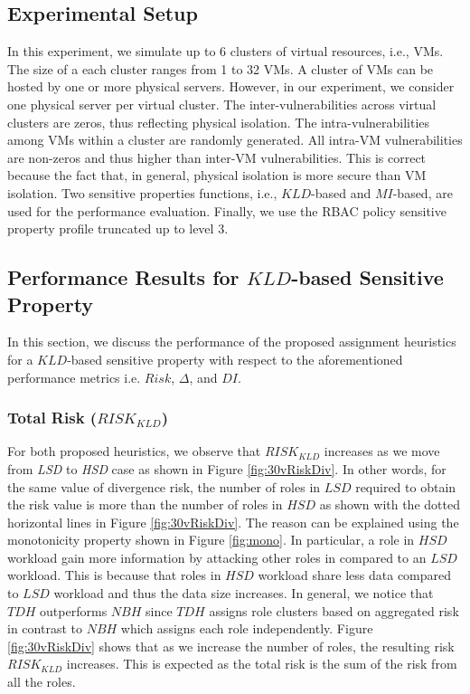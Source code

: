 \subsection{Experimental Setup}
In this experiment, we simulate up to 6 clusters of virtual resources, i.e., VMs. The size of a each cluster ranges from 1 to 32 VMs. A cluster of VMs can be hosted by one or more physical servers. However, in our experiment, we consider one physical server per virtual cluster. The inter-vulnerabilities across virtual clusters are zeros, thus reflecting  physical isolation. The intra-vulnerabilities among VMs within a cluster are randomly generated. All intra-VM vulnerabilities are non-zeros and thus higher than inter-VM vulnerabilities. This is correct because the fact that, in general, physical isolation is more secure than VM isolation. Two sensitive properties functions, i.e., $KLD$-based and $MI$-based, are used for the performance evaluation. Finally, we use the RBAC policy sensitive property profile truncated up to level 3.


\subsection{Performance Results for $KLD$-based Sensitive Property}
In this section, we discuss the performance of the proposed assignment heuristics for a $KLD$-based sensitive property with respect to the aforementioned performance metrics i.e. $Risk$, $\Delta$, and $DI$. 

\subsubsection{Total Risk ($RISK_{KLD}$)}
For both proposed heuristics, we observe that $RISK_{KLD}$ increases as we move from \textit{LSD} to \textit{HSD} case as shown in Figure \ref{fig:30vRiskDiv}. In other words, for the same value of divergence risk, the number of roles in $LSD$ required to obtain the risk value is more than the number of roles in $HSD$ as shown with the dotted horizontal lines in Figure \ref{fig:30vRiskDiv}. The reason can be explained using the monotonicity property shown in Figure \ref{fig:mono}. In particular, a role in $HSD$ workload gain more information by attacking other roles in compared to an $LSD$ workload. This is because that roles in $HSD$ workload share less data compared to $LSD$ workload and thus the data size increases. In general, we notice that $TDH$ outperforms $NBH$ since $TDH$ assigns role clusters based on aggregated risk  in contrast to $NBH$ which assigns each role independently. Figure \ref{fig:30vRiskDiv} shows that as we increase the number of roles, the resulting risk $RISK_{KLD}$ increases. This is expected as the total risk is the sum of  the risk from all the roles. 

